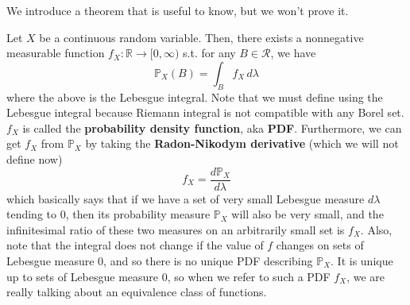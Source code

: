\documentclass{article}
\begin{document}
      We introduce a theorem that is useful to know, but we won't prove it. 

      \begin{theorem}
        Let $X$ be a continuous random variable. Then, there exists a nonnegative measurable function $f_X : \mathbb{R} \longrightarrow [0, \infty)$ s.t. for any $B \in \mathcal{R}$, we have 
        \begin{equation}
          \mathbb{P}_X (B) = \int_B f_X \, d\lambda
        \end{equation}
        where the above is the Lebesgue integral. Note that we must define using the Lebesgue integral because Riemann integral is not compatible with any Borel set. $f_X$ is called the \textbf{probability density function}, aka \textbf{PDF}. Furthermore, we can get $f_X$ from $\mathbb{P}_X$ by taking the \textbf{Radon-Nikodym derivative} (which we will not define now)
        \begin{equation}
          f_X = \frac{d \mathbb{P}_X}{d \lambda}
        \end{equation}
        which basically says that if we have a set of very small Lebesgue measure $d \lambda$ tending to $0$, then its probability measure $\mathbb{P}_X$ will also be very small, and the infinitesimal ratio of these two measures on an arbitrarily small set is $f_X$. Also, note that the integral does not change if the value of $f$ changes on sets of Lebesgue measure $0$, and so there is no unique PDF describing $\mathbb{P}_X$. It is unique up to sets of Lebesgue measure $0$, so when we refer to such a PDF $f_X$, we are really talking about an equivalence class of functions. 
      \end{theorem}
\end{document}
